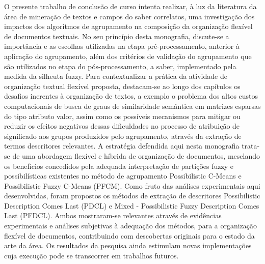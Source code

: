 O presente trabalho de conclusão de curso intenta realizar, à luz da literatura da área de mineração
de textos e campos do saber correlatos, uma investigação dos impactos dos algoritmos de agrupamento
na composição da organização flexível de documentos textuais. No seu princípio desta monografia,
discute-se a importância e as escolhas utilizadas na etapa pré-processamento, anterior à aplicação
do agrupamento, além dos critérios de validação do agrupamento que são utilizados no etapa do
pós-processamento, a saber, implementado pela medida da silheuta fuzzy. Para contextualizar a
prática da atividade de organização textual flexível proposta, destacam-se ao longo dos capítulos os
desafios inerentes à organização de textos, a exemplo o problema dos altos custos computacionais de
busca de graus de similaridade semântica em matrizes esparsas do tipo atributo valor, assim como os
possíveis mecanismos para mitigar ou reduzir os efeitos negativos dessas dificuldades no processo de
atribuição de significado aos grupos produzidos pelo agrupamento, através da extração de termos
descritores relevantes. A estratégia defendida aqui nesta monografia trata-se de uma abordagem
flexível e híbrida de organização de documentos, mesclando os benefícios concedidos pela adequada
interpretação de partições fuzzy e possibilísticas existentes no método de agrupamento Possibilistic
C-Means e Possibilistic Fuzzy C-Means (PFCM). Como fruto das análises experimentais aqui
desenvolvidas, foram propostos os métodos de extração de descritores Possibilistic Description Comes
Last (PDCL) e Mixed - Possibilistic Fuzzy Description Comes Last (PFDCL). Ambos mostraram-se
relevantes através de evidências experimentais e análises subjetivas à adequação dos métodos, para a
organização flexível de documentos, contribuindo com descobertas originais para o estado da arte da
área. Os resultados da pesquisa ainda estimulam novas implementações cuja execução pode se
transcorrer em trabalhos futuros.
